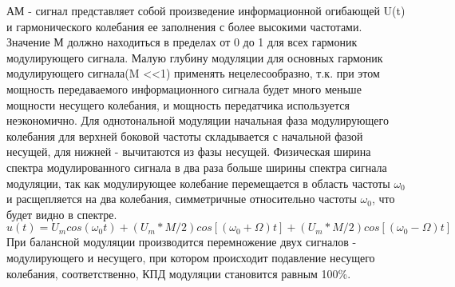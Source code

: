 АМ - сигнал представляет собой произведение информационной огибающей U(t)
и гармонического колебания ее заполнения с более высокими частотами.
Значение М должно находиться в пределах от 0 до 1 для всех гармоник модулирующего сигнала. Малую глубину модуляции для основных гармоник модулирующего сигнала(M <<1) применять нецелесообразно, т.к. при этом мощность передаваемого информационного сигнала будет много меньше мощности несущего колебания,
и мощность передатчика используется неэкономично. Для однотональной
модуляции начальная фаза модулирующего колебания для верхней боковой частоты складывается с начальной фазой несущей, для нижней - вычитаются из фазы несущей. Физическая ширина спектра модулированного
сигнала в два раза больше ширины спектра сигнала модуляции, так как
модулирующее колебание перемещается в область частоты $\omega_0$ и расщепляется на два колебания, симметричные относительно частоты $\omega_0$, что будет видно в спектре.
$$ u(t) = U_m cos(\omega_0 t) + (U_m * M/2)cos[(\omega_0 + \Omega)t] + (U_m * M/2)cos[(\omega_0 - \Omega)t] $$
При балансной модуляции производится перемножение двух сигналов - модулирующего и несущего, при котором происходит подавление несущего колебания, соответственно, КПД модуляции становится равным 100\%.
